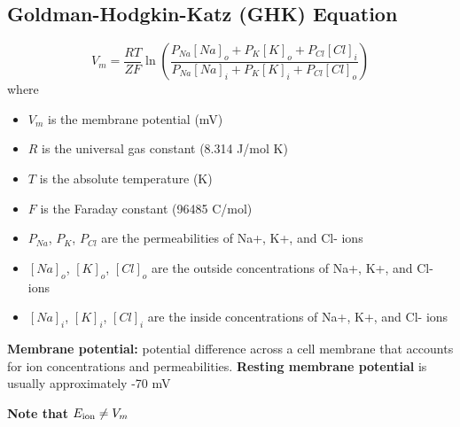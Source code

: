 \documentclass[11pt,fleqn]{book} %
\begin{document}
\subsection{Goldman-Hodgkin-Katz (GHK) Equation} 
\begin{theorem}
    $$V_m = \frac{RT}{ZF} \ln \left(\frac{P_{Na}[Na]_o + P_K[K]_o + P_{Cl}[Cl]_i}{P_{Na}[Na]_i + P_K[K]_i + P_{Cl}[Cl]_o} \right)$$
    where
    \begin{itemize}
      \item $V_m$ is the membrane potential (mV)
      \item $R$ is the universal gas constant (8.314 J/mol K)
      \item $T$ is the absolute temperature (K)  
      \item $F$ is the Faraday constant (96485 C/mol)
      \item $P_{Na}$, $P_K$, $P_{Cl}$ are the permeabilities of Na+, K+, and Cl- ions
      \item $[Na]_o$, $[K]_o$, $[Cl]_o$ are the outside concentrations of Na+, K+, and Cl- ions
      \item $[Na]_i$, $[K]_i$, $[Cl]_i$ are the inside concentrations of Na+, K+, and Cl- ions
    \end{itemize}
    \textbf{Membrane potential:} potential difference across a cell membrane that accounts for ion concentrations and permeabilities. \textbf{Resting membrane potential} is usually approximately -70 mV
\end{theorem} 
\begin{remark}
    \textbf{Note that} $E_{\rm ion}\neq V_m$
\end{remark}
\end{document}
